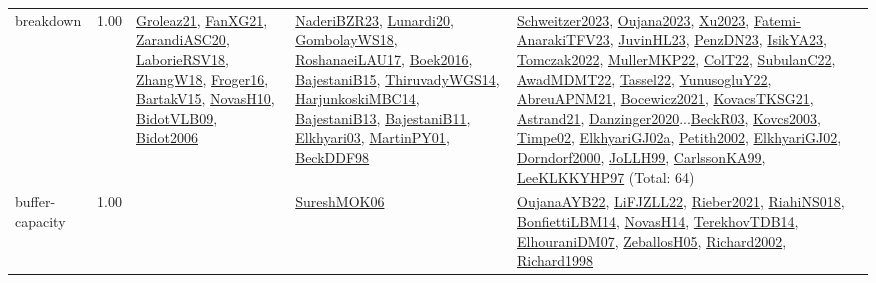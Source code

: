 {\begin{longtable}{p{3cm}r>{\raggedright\arraybackslash}p{6cm}>{\raggedright\arraybackslash}p{6cm}>{\raggedright\arraybackslash}p{8cm}}
\index{breakdown}\index{Concepts!breakdown}breakdown &  1.00 & \hyperref[detail:Groleaz21]{Groleaz21}, \hyperref[detail:FanXG21]{FanXG21}, \hyperref[detail:ZarandiASC20]{ZarandiASC20}, \hyperref[detail:LaborieRSV18]{LaborieRSV18}, \hyperref[detail:ZhangW18]{ZhangW18}, \hyperref[detail:Froger16]{Froger16}, \hyperref[detail:BartakV15]{BartakV15}, \hyperref[detail:NovasH10]{NovasH10}, \hyperref[detail:BidotVLB09]{BidotVLB09}, \hyperref[detail:Bidot2006]{Bidot2006} & \hyperref[detail:NaderiBZR23]{NaderiBZR23}, \hyperref[detail:Lunardi20]{Lunardi20}, \hyperref[detail:GombolayWS18]{GombolayWS18}, \hyperref[detail:RoshanaeiLAU17]{RoshanaeiLAU17}, \hyperref[detail:Boek2016]{Boek2016}, \hyperref[detail:BajestaniB15]{BajestaniB15}, \hyperref[detail:ThiruvadyWGS14]{ThiruvadyWGS14}, \hyperref[detail:HarjunkoskiMBC14]{HarjunkoskiMBC14}, \hyperref[detail:BajestaniB13]{BajestaniB13}, \hyperref[detail:BajestaniB11]{BajestaniB11}, \hyperref[detail:Elkhyari03]{Elkhyari03}, \hyperref[detail:MartinPY01]{MartinPY01}, \hyperref[detail:BeckDDF98]{BeckDDF98} & \hyperref[detail:Schweitzer2023]{Schweitzer2023}, \hyperref[detail:Oujana2023]{Oujana2023}, \hyperref[detail:Xu2023]{Xu2023}, \hyperref[detail:Fatemi-AnarakiTFV23]{Fatemi-AnarakiTFV23}, \hyperref[detail:JuvinHL23]{JuvinHL23}, \hyperref[detail:PenzDN23]{PenzDN23}, \hyperref[detail:IsikYA23]{IsikYA23}, \hyperref[detail:Tomczak2022]{Tomczak2022}, \hyperref[detail:MullerMKP22]{MullerMKP22}, \hyperref[detail:ColT22]{ColT22}, \hyperref[detail:SubulanC22]{SubulanC22}, \hyperref[detail:AwadMDMT22]{AwadMDMT22}, \hyperref[detail:Tassel22]{Tassel22}, \hyperref[detail:YunusogluY22]{YunusogluY22}, \hyperref[detail:AbreuAPNM21]{AbreuAPNM21}, \hyperref[detail:Bocewicz2021]{Bocewicz2021}, \hyperref[detail:KovacsTKSG21]{KovacsTKSG21}, \hyperref[detail:Astrand21]{Astrand21}, \hyperref[detail:Danzinger2020]{Danzinger2020}...\hyperref[detail:BeckR03]{BeckR03}, \hyperref[detail:Kovcs2003]{Kovcs2003}, \hyperref[detail:Timpe02]{Timpe02}, \hyperref[detail:ElkhyariGJ02a]{ElkhyariGJ02a}, \hyperref[detail:Petith2002]{Petith2002}, \hyperref[detail:ElkhyariGJ02]{ElkhyariGJ02}, \hyperref[detail:Dorndorf2000]{Dorndorf2000}, \hyperref[detail:JoLLH99]{JoLLH99}, \hyperref[detail:CarlssonKA99]{CarlssonKA99}, \hyperref[detail:LeeKLKKYHP97]{LeeKLKKYHP97} (Total: 64)\\
\index{buffer-capacity}\index{Concepts!buffer-capacity}buffer-capacity &  1.00 &  & \hyperref[detail:SureshMOK06]{SureshMOK06} & \hyperref[detail:OujanaAYB22]{OujanaAYB22}, \hyperref[detail:LiFJZLL22]{LiFJZLL22}, \hyperref[detail:Rieber2021]{Rieber2021}, \hyperref[detail:RiahiNS018]{RiahiNS018}, \hyperref[detail:BonfiettiLBM14]{BonfiettiLBM14}, \hyperref[detail:NovasH14]{NovasH14}, \hyperref[detail:TerekhovTDB14]{TerekhovTDB14}, \hyperref[detail:ElhouraniDM07]{ElhouraniDM07}, \hyperref[detail:ZeballosH05]{ZeballosH05}, \hyperref[detail:Richard2002]{Richard2002}, \hyperref[detail:Richard1998]{Richard1998}\\

\end{longtable}}
